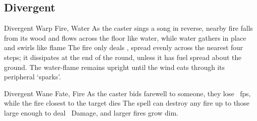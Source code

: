 \begin{multicols}{2}

\subsection{Divergent}
\label{divergentSpells}

  {Divergent}%
  {Warp}%
  {Fire, Water}%
  {}%
  {As the caster sings a song in reverse, nearby fire falls from its wood and flows across the floor like water, while water gathers in place and swirls like flame}%
  {
  The fire only deals \showDam, spread evenly across the nearest four \glspl{step}; it dissipates at the end of the \gls{round}, unless it has fuel spread about the ground.
  The water-flame remains upright until the wind eats through its peripheral `sparks'.
  }

  {Divergent}%
  {Wane}%
  {Fate, Fire}%
  {}%
  {As the caster bids farewell to someone, they lose \showDam~\glspl{fp}, while the fire closest to the target dies}%
  {
  The spell can destroy any fire up to those large enough to deal \showDam\ Damage, and larger fires grow dim.}


\iftoggle{intro}{}{
  \spell{Miner's Bane}%
    {Divergent}%
    {Wane}%
    {Earth, Air}%
    {\roll{Speed}{Cultivation}}%
    {As the caster curses the target's bread, air, and Sunlight, the ground underneath their feet softens, and their next breath of air sticks to the inside of their throat like thorny cotton.
    Targets who fail to dart away quickly fall prone, and take \arabic{spellPlusTwo}~\glspl{ep} unless they held their breath}%
    {
    This spell relies on soft ground to make the target slip.
    Harder floors will not melt, and the spell will settle on the nearest soft earth it can find.}

  \spell{Finding Courage}%
    {Divergent}%
    {Wax}%
    {Earth, Fate}%
    {malleability of the earth}%
    {Reaching into some soft ground, such as snow or mud, the caster begs for a chance to fight, and the ground forms into a weapon.
    The caster then gains \arabic{spellPlusTwo}~\glspl{fp}.
    The shatters if it deals over \arabic{spellPlusTwo} Damage}%
    {
    The weapon can be anything the caster has used before, up to \pgls{weight} of \arabic{spellPlusTwo}}

}
\end{multicols}
